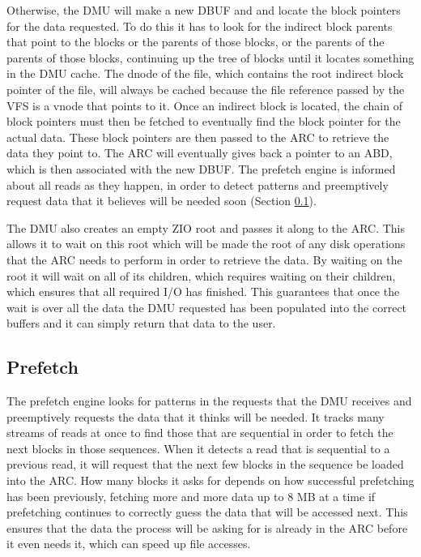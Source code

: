 Otherwise, the DMU will make a new DBUF and and locate the block pointers for the data requested.
To do this it has to look for the indirect block parents that point to the blocks or the parents of those blocks,
or the parents of the parents of those blocks, 
continuing up the tree of blocks until it locates something in the DMU cache.
The dnode of the file, which contains the root indirect block pointer of the file,
will always be cached because the file reference passed by the VFS is a vnode that points to it.
Once an indirect block is located, the chain of block pointers must then be fetched to eventually 
find the block pointer for the actual data.
These block pointers are then passed to the ARC to retrieve the data they point to.
The ARC will eventually gives back a pointer to an ABD, which is then associated with the new DBUF.
The prefetch engine is informed about all reads as they happen, in order to detect patterns and preemptively
request data that it believes will be needed soon (Section \ref{chapter:prefetch}).

The DMU also creates an empty ZIO root and passes it along to the ARC.
This allows it to wait on this root which will be made the root of any disk operations that the ARC
needs to perform in order to retrieve the data.
By waiting on the root it will wait on all of its children, which requires waiting on their children, 
which ensures that all required I/O has finished.
This guarantees that once the wait is over all the data the DMU requested has been populated into the correct buffers
and it can simply return that data to the user.

\subsection{Prefetch}
\label{chapter:prefetch}
The prefetch engine looks for patterns in the requests that the DMU receives and preemptively requests the data that it thinks will be needed\cite{ahrens_read_write}.
It tracks many streams of reads at once  to find those that are sequential in order to fetch the next blocks in those sequences.
When it detects a read that is sequential to a previous read, it will request that the next
few blocks in the sequence be loaded into the ARC.
How many blocks it asks for depends on how successful prefetching has been previously, fetching
more and more data up to 8 MB at a time if prefetching continues to correctly guess the data that will be
accessed next\cite[{module/zfs/dmu.c} {module/zfs/dbuf.c}]{zfs}.
This ensures that the data the process will be asking for is already in the ARC before it even needs it,
which can speed up file accesses.

